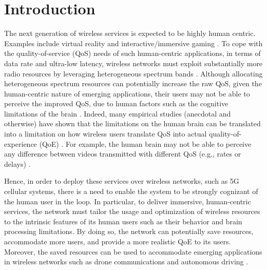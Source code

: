 \documentclass[journal,draftclsnofoot,onecolumn,12pt]{IEEEtran}%
\begin{document}
	
	
	
	
	
	\IEEEpeerreviewmaketitle
	
	
	 
	\section{Introduction}
	The next generation of wireless services is expected to be highly human centric. Examples include virtual reality and interactive/immersive gaming \cite{saad2019vision,gobbetti1998virtual,chen2017virtual}. 
    To cope with the quality-of-service (QoS) needs of such human-centric applications, in terms of data rate and ultra-low latency, wireless networks must exploit substantially more radio resources by leveraging heterogeneous spectrum bands  \cite{semiari2015context}. Although allocating heterogeneous spectrum resources can potentially increase the raw QoS, given the human-centric nature of emerging applications, their users may not be able to perceive the improved QoS, due to human factors such as the cognitive limitations of the brain \cite{RN1}. Indeed, many empirical studies (anecdotal and otherwise) have shown that the limitations on the human brain can be translated into a limitation on how wireless users translate QoS into actual quality-of-experience (QoE) \cite{Laghari2013Neuro,Wechsung2014Springer,Zhao2017QoE}. For example, the human brain may not be able to perceive any difference between videos transmitted with different QoS (e.g., rates or delays) \cite{Zhao2017QoE,Chen2015QoE}. 
 
 
    Hence, in order to deploy these services over wireless networks, such as 5G cellular systems, there is a need to enable the system to be strongly cognizant of the human user in the loop. In particular, to deliver  immersive, human-centric services, the network must tailor the usage and optimization of wireless resources to the intrinsic features of its human users such as their behavior and brain processing limitations. By doing so, the network can potentially save resources, accommodate more users,  and provide a more realistic QoE to its users. {Moreover, the saved resources can be used to accommodate emerging applications in wireless networks such as drone communications \cite{rahmati2019dynamic,kasgari2019uav} and autonomous driving \cite{reviewer1Transportation,ferdowsi2018robust,reviewer5IndustInfo,reviewer2Network}}.
	
\end{document}
